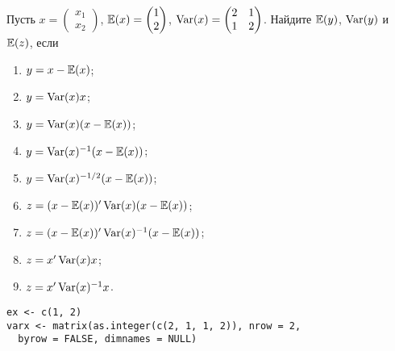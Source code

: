 \begin{problem}
Пусть  $x = \begin{pmatrix} x_1 \\ x_2 \end{pmatrix}$, $\mathbb{E}(x) = \begin{pmatrix} 1 \\ 2 \end{pmatrix}$, $\operatorname{Var}(x) = \begin{pmatrix} 2 & 1 \\ 1 & 2 \end{pmatrix}$. Найдите $\mathbb{E}(y)$, $\operatorname{Var}(y)$ и $\mathbb{E}(z)$, если
\begin{enumerate}
\item $y = x - \mathbb{E}(x)$;
\item $y = \operatorname{Var}(x)x$;
\item $y = \operatorname{Var}(x)(x - \mathbb{E}(x))$;
\item $y = \operatorname{Var}(x)^{-1}(x - \mathbb{E}(x))$;
\item $y = \operatorname{Var}(x)^{-1/2}(x - \mathbb{E}(x))$;
\item $z = (x - \mathbb{E}(x))'\operatorname{Var}(x)(x - \mathbb{E}(x))$;
\item $z = (x - \mathbb{E}(x))'\operatorname{Var}(x)^{-1}(x - \mathbb{E}(x))$;
\item $z = x'\operatorname{Var}(x)x$;
\item $z = x'\operatorname{Var}(x)^{-1}x$.
\end{enumerate}


\begin{sol}
\begin{verbatim}
ex <- c(1, 2)
varx <- matrix(as.integer(c(2, 1, 1, 2)), nrow = 2,
  byrow = FALSE, dimnames = NULL)
\end{verbatim}

\end{sol}
\end{problem}



